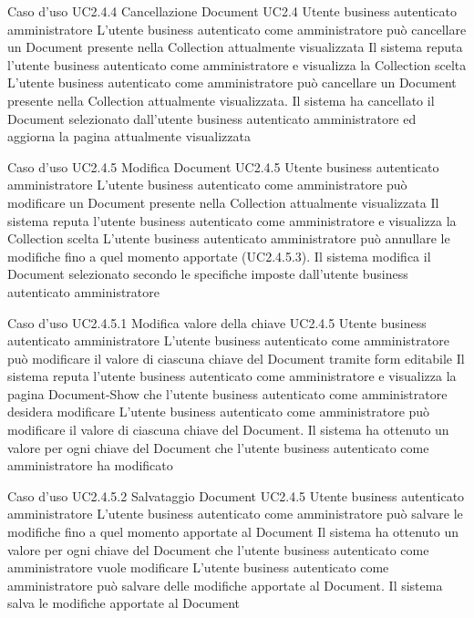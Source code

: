 \UCtitle
{Caso d'uso UC2.4.4}
{Cancellazione Document}
\UC
{UC2.4}
{Utente business autenticato amministratore}
{L'utente business autenticato come amministratore può cancellare un Document presente nella Collection attualmente visualizzata}
{Il sistema reputa l'utente business autenticato come amministratore e visualizza la Collection scelta}
\scenario
{L'utente business autenticato come amministratore può cancellare un Document presente nella Collection attualmente visualizzata.}
\post
{Il sistema ha cancellato il Document selezionato dall'utente business autenticato amministratore ed aggiorna la pagina attualmente visualizzata}

\UCtitle
{Caso d'uso UC2.4.5}
{Modifica Document}
\UC
{UC2.4.5}
{Utente business autenticato amministratore}
{L'utente business autenticato come amministratore può modificare un Document presente nella Collection attualmente visualizzata}
{Il sistema reputa l'utente business autenticato come amministratore e visualizza la Collection scelta}
\estensioni
{L'utente business autenticato amministratore può annullare le modifiche fino a quel momento apportate (UC2.4.5.3).}
\post
{Il sistema modifica il Document selezionato secondo le specifiche imposte dall'utente business autenticato amministratore}


\UCtitle
{Caso d'uso UC2.4.5.1}
{Modifica valore della chiave}
\UC
{UC2.4.5}
{Utente business autenticato amministratore}
{L'utente business autenticato come amministratore può modificare il valore di ciascuna chiave del Document tramite form editabile}
{Il sistema reputa l'utente business autenticato come amministratore e visualizza la pagina Document-Show che l'utente business autenticato come amministratore desidera modificare}
\scenario
{L'utente business autenticato come amministratore può modificare il valore di ciascuna chiave del Document.}
\post
{Il sistema ha ottenuto un valore per ogni chiave del Document che l'utente business autenticato come amministratore ha modificato}

\UCtitle
{Caso d'uso UC2.4.5.2}
{Salvataggio Document}
\UC
{UC2.4.5}
{Utente business autenticato amministratore}
{L'utente business autenticato come amministratore può salvare le modifiche fino a quel momento apportate al Document}
{Il sistema ha ottenuto un valore per ogni chiave del Document che l'utente business autenticato come amministratore vuole modificare}
\scenario
{L'utente business autenticato come amministratore può salvare delle modifiche apportate al Document.}
\post
{Il sistema salva le modifiche apportate al Document}


